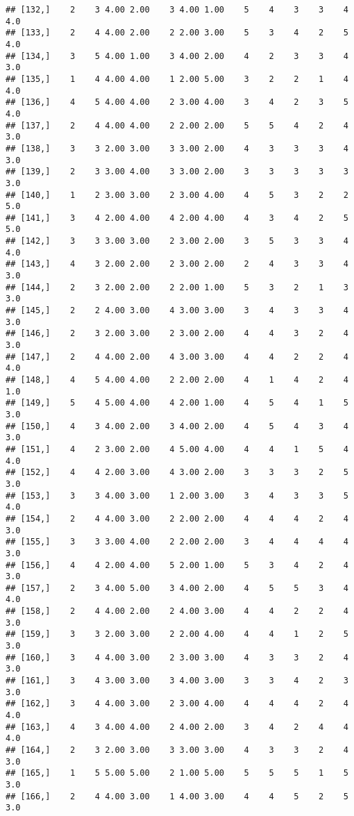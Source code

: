 \documentclass[]{article}
\begin{document}
\begin{verbatim}
## [132,]    2    3 4.00 2.00    3 4.00 1.00    5    4    3    3    4  4.0
## [133,]    2    4 4.00 2.00    2 2.00 3.00    5    3    4    2    5  4.0
## [134,]    3    5 4.00 1.00    3 4.00 2.00    4    2    3    3    4  3.0
## [135,]    1    4 4.00 4.00    1 2.00 5.00    3    2    2    1    4  4.0
## [136,]    4    5 4.00 4.00    2 3.00 4.00    3    4    2    3    5  4.0
## [137,]    2    4 4.00 4.00    2 2.00 2.00    5    5    4    2    4  3.0
## [138,]    3    3 2.00 3.00    3 3.00 2.00    4    3    3    3    4  3.0
## [139,]    2    3 3.00 4.00    3 3.00 2.00    3    3    3    3    3  3.0
## [140,]    1    2 3.00 3.00    2 3.00 4.00    4    5    3    2    2  5.0
## [141,]    3    4 2.00 4.00    4 2.00 4.00    4    3    4    2    5  5.0
## [142,]    3    3 3.00 3.00    2 3.00 2.00    3    5    3    3    4  4.0
## [143,]    4    3 2.00 2.00    2 3.00 2.00    2    4    3    3    4  3.0
## [144,]    2    3 2.00 2.00    2 2.00 1.00    5    3    2    1    3  3.0
## [145,]    2    2 4.00 3.00    4 3.00 3.00    3    4    3    3    4  3.0
## [146,]    2    3 2.00 3.00    2 3.00 2.00    4    4    3    2    4  3.0
## [147,]    2    4 4.00 2.00    4 3.00 3.00    4    4    2    2    4  4.0
## [148,]    4    5 4.00 4.00    2 2.00 2.00    4    1    4    2    4  1.0
## [149,]    5    4 5.00 4.00    4 2.00 1.00    4    5    4    1    5  3.0
## [150,]    4    3 4.00 2.00    3 4.00 2.00    4    5    4    3    4  3.0
## [151,]    4    2 3.00 2.00    4 5.00 4.00    4    4    1    5    4  4.0
## [152,]    4    4 2.00 3.00    4 3.00 2.00    3    3    3    2    5  3.0
## [153,]    3    3 4.00 3.00    1 2.00 3.00    3    4    3    3    5  4.0
## [154,]    2    4 4.00 3.00    2 2.00 2.00    4    4    4    2    4  3.0
## [155,]    3    3 3.00 4.00    2 2.00 2.00    3    4    4    4    4  3.0
## [156,]    4    4 2.00 4.00    5 2.00 1.00    5    3    4    2    4  3.0
## [157,]    2    3 4.00 5.00    3 4.00 2.00    4    5    5    3    4  4.0
## [158,]    2    4 4.00 2.00    2 4.00 3.00    4    4    2    2    4  3.0
## [159,]    3    3 2.00 3.00    2 2.00 4.00    4    4    1    2    5  3.0
## [160,]    3    4 4.00 3.00    2 3.00 3.00    4    3    3    2    4  3.0
## [161,]    3    4 3.00 3.00    3 4.00 3.00    3    3    4    2    3  3.0
## [162,]    3    4 4.00 3.00    2 3.00 4.00    4    4    4    2    4  4.0
## [163,]    4    3 4.00 4.00    2 4.00 2.00    3    4    2    4    4  4.0
## [164,]    2    3 2.00 3.00    3 3.00 3.00    4    3    3    2    4  3.0
## [165,]    1    5 5.00 5.00    2 1.00 5.00    5    5    5    1    5  3.0
## [166,]    2    4 4.00 3.00    1 4.00 3.00    4    4    5    2    5  3.0

\end{verbatim}
\end{document}
